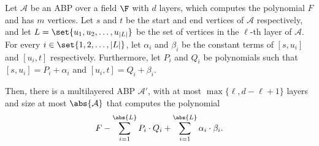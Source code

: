 \begin{lemma}\label{lem:shrinkage for a single layered abp}
	Let $\mathcal{A}$ be an ABP over a field $\F$ with $d$ layers, which computes the polynomial $F$ and has $m$ vertices. Let $s$ and $t$ be the start and end vertices of $\mathcal{A}$ respectively, and let $L = \set{u_1, u_2, \ldots, u_{|L|}}$ be the set of vertices in the $\ell$-th layer of $\mathcal{A}$. For every $i \in \set{1, 2, \ldots, |L|}$, let $\alpha_i$ and $\beta_i$ be the constant terms of $[s,u_i]$ and $[u_i,t]$ respectively. Furthermore, let $P_i$ and $Q_i$ be polynomials such that $[s,u_i] = P_i + \alpha_i$ and $[u_i,t] = Q_i + \beta_i$.
		
	Then, there is a multilayered ABP ${\mathcal{{A}}}'$,  with at most $\max\{\ell, d-\ell + 1\}$ layers and size at most $\abs{\mathcal{A}}$ that computes the polynomial 
	\[
		F - \sum_{i=1}^{\abs{L}} P_i \cdot Q_i + \sum_{i=1}^{\abs{L}} \alpha_i \cdot \beta_i .
	\]
\end{lemma}
	
